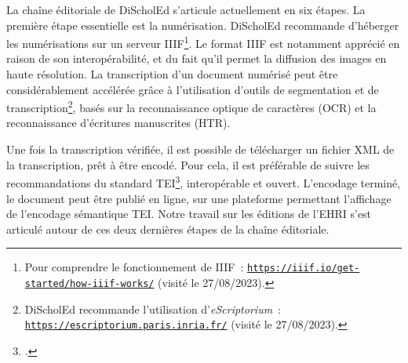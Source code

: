 La chaîne éditoriale de DiScholEd s'articule actuellement en six étapes. La première étape essentielle est la numérisation. DiScholEd recommande d'héberger les numérisations sur un serveur IIIF\footnote{Pour comprendre le fonctionnement de IIIF~: \texttt{\href{https://iiif.io/get-started/how-iiif-works/}{https://iiif.io/get-started/how-iiif-works/}} (visité le 27/08/2023).}. Le format IIIF est notamment apprécié en raison de son interopérabilité, et du fait qu'il permet la diffusion des images en haute résolution. La transcription d'un document numérisé peut être considérablement accélérée grâce à l'utilisation d'outils de segmentation et de transcription\footnote{DiScholEd recommande l'utilisation d'\textit{eScriptorium}~: \texttt{\href{https://escriptorium.paris.inria.fr/}{https://escriptorium.paris.inria.fr/}} (visité le 27/08/2023).}, basés sur la reconnaissance optique de caractères (OCR) et la reconnaissance d'écritures manuscrites (HTR).

Une fois la transcription vérifiée, il est possible de télécharger un fichier XML de la transcription, prêt à être encodé. Pour cela, il est préférable de suivre les recommandations du standard TEI\footcite{TEIGuidelines}, interopérable et ouvert. L'encodage terminé, le document peut être publié en ligne, sur une plateforme permettant l'affichage de l'encodage sémantique TEI. Notre travail sur les éditions de l'EHRI s'est articulé autour de ces deux dernières étapes de la chaîne éditoriale.  